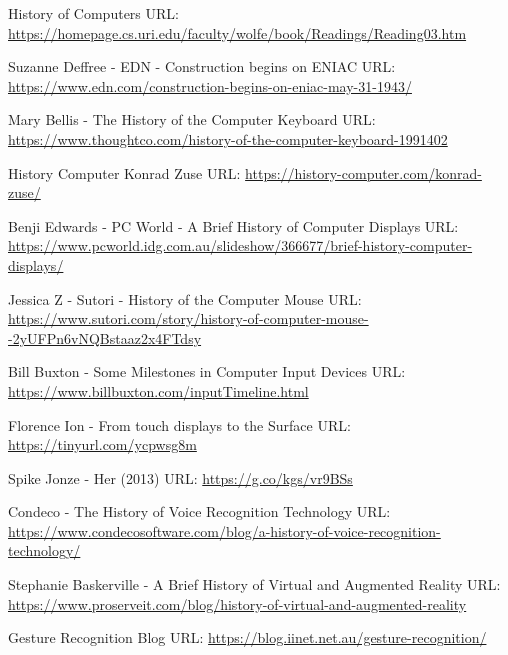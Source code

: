 \documentclass{article}
\begin{document}
\newpage
\begin{thebibliography}{00}
    
 History of Computers
\newline
URL: \url{https://homepage.cs.uri.edu/faculty/wolfe/book/Readings/Reading03.htm}

 Suzanne Deffree - EDN - Construction begins on ENIAC
\newline
URL: \url{https://www.edn.com/construction-begins-on-eniac-may-31-1943/}

 Mary Bellis - The History of the Computer Keyboard
\newline
URL: \url{https://www.thoughtco.com/history-of-the-computer-keyboard-1991402}

 History Computer Konrad Zuse
\newline
URL: \url{https://history-computer.com/konrad-zuse/}

 Benji Edwards - PC World - A Brief History of Computer Displays
\newline
URL: \url{https://www.pcworld.idg.com.au/slideshow/366677/brief-history-computer-displays/}

 Jessica Z - Sutori - History of the Computer Mouse
\newline
URL: \url{https://www.sutori.com/story/history-of-computer-mouse--2yUFPn6vNQBstaaz2x4FTdsy}

 Bill Buxton - Some Milestones in Computer Input Devices
\newline
URL: \url{https://www.billbuxton.com/inputTimeline.html}

 Florence Ion - From touch displays to the Surface
\newline
URL: \url{https://tinyurl.com/ycpwsg8m}

 Spike Jonze - Her (2013)
\newline
URL: \url{https://g.co/kgs/vr9BSs}

 Condeco - The History of Voice Recognition Technology
\newline
URL: \url{https://www.condecosoftware.com/blog/a-history-of-voice-recognition-technology/}

  Stephanie Baskerville - A Brief History of Virtual and Augmented Reality
\newline
URL: \url{https://www.proserveit.com/blog/history-of-virtual-and-augmented-reality}

 Gesture Recognition Blog
\newline
URL: \url{https://blog.iinet.net.au/gesture-recognition/}


\end{thebibliography}
\end{document}
